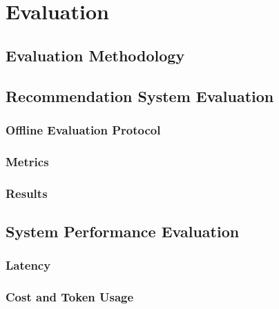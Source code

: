 \chapter{Evaluation}
\label{chap:evaluation}

\section{Evaluation Methodology}
\label{sec:eval-methodology}


\section{Recommendation System Evaluation}
\label{sec:eval-recsys}

\subsection{Offline Evaluation Protocol}
\label{subsec:eval-offline-protocol}


\subsection{Metrics}
\label{subsec:eval-metrics}


\subsection{Results}
\label{subsec:eval-recsys-results}


\section{System Performance Evaluation}
\label{sec:eval-system}

\subsection{Latency}
\label{subsec:eval-latency}


\subsection{Cost and Token Usage}
\label{subsec:eval-cost}

